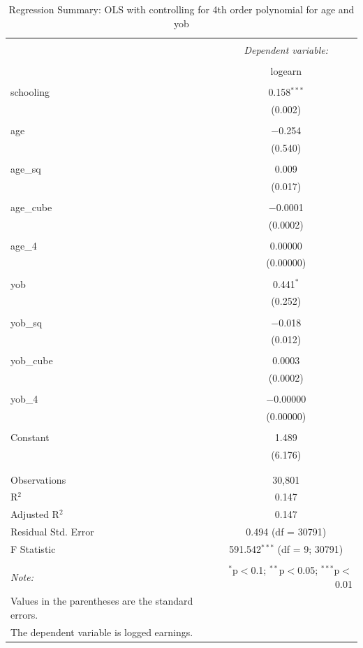 \documentclass[a4paper,12pt,oneside,English]{article}
\begin{document}
\begin{table}[!htbp] \centering 
  \caption{Regression Summary: OLS with controlling for 4th order polynomial for age and yob} 
  \label{reg 1} 
\begin{tabular}{@{\extracolsep{5pt}}lc} 
\\[-1.8ex]\hline 
\hline \\[-1.8ex] 
 & \multicolumn{1}{c}{\textit{Dependent variable:}} \\ 
\cline{2-2} 
\\[-1.8ex] & logearn \\ 
\hline \\[-1.8ex] 
 schooling & 0.158$^{***}$ \\ 
  & (0.002) \\ 
  & \\ 
 age & $-$0.254 \\ 
  & (0.540) \\ 
  & \\ 
 age\_sq & 0.009 \\ 
  & (0.017) \\ 
  & \\ 
 age\_cube & $-$0.0001 \\ 
  & (0.0002) \\ 
  & \\ 
 age\_4 & 0.00000 \\ 
  & (0.00000) \\ 
  & \\ 
 yob & 0.441$^{*}$ \\ 
  & (0.252) \\ 
  & \\ 
 yob\_sq & $-$0.018 \\ 
  & (0.012) \\ 
  & \\ 
 yob\_cube & 0.0003 \\ 
  & (0.0002) \\ 
  & \\ 
 yob\_4 & $-$0.00000 \\ 
  & (0.00000) \\ 
  & \\ 
 Constant & 1.489 \\ 
  & (6.176) \\ 
  & \\ 
\hline \\[-1.8ex] 
Observations & 30,801 \\ 
R$^{2}$ & 0.147 \\ 
Adjusted R$^{2}$ & 0.147 \\ 
Residual Std. Error & 0.494 (df = 30791) \\ 
F Statistic & 591.542$^{***}$ (df = 9; 30791) \\ 
\hline 
\hline \\[-1.8ex] 
\textit{Note:}  & \multicolumn{1}{r}{$^{*}$p$<$0.1; $^{**}$p$<$0.05; $^{***}$p$<$0.01} \\ Values in the parentheses are the standard errors.\\The dependent variable is logged earnings.
\end{tabular} 
\end{table}
\end{document}
